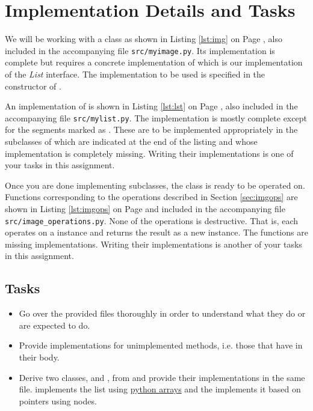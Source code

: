 \documentclass[addpoints]{exam}
\begin{document}
  \section{Implementation Details and Tasks}

  We will be working with a  class as shown in Listing \ref{lst:img} on Page \pageref{lst:img}, also included in the accompanying file \texttt{src/myimage.py}. Its implementation is complete but requires a concrete implementation of  which is our implementation of the \textit{List} interface. The implementation to be used is specified in the constructor of .

  An implementation of  is shown in Listing \ref{lst:lst} on Page \pageref{lst:lst}, also included in the accompanying file \texttt{src/mylist.py}. The implementation is mostly complete except for the segments marked as . These are to be implemented appropriately in the subclasses of  which are indicated at the end of the listing and whose implementation is completely missing. Writing their implementations is one of your tasks in this assignment.

  Once you are done implementing  subclasses, the  class is ready to be operated on. Functions corresponding to the operations described in Section \ref{sec:imgops} are shown in Listing \ref{lst:imgops} on Page \pageref{lst:imgops} and included in the accompanying file \texttt{src/image\_operations.py}. None of the operations is destructive. That is, each operates on a  instance and returns the result as a new  instance. The functions are missing implementations. Writing their implementations is another of your tasks in this assignment.

  \subsection{Tasks}
  \label{sec:tasks}

  \begin{itemize}
  \item Go over the provided files thoroughly in order to understand what they do or are expected to do.
  \item Provide implementations for unimplemented methods, i.e. those that have  in their body.
  \item Derive two classes,  and , from  and provide their implementations in the same file.  implements the list using \href{https://www.programiz.com/python-programming/array}{python arrays} and the  implements it based on pointers using nodes.
  \end{itemize}
\end{document}
